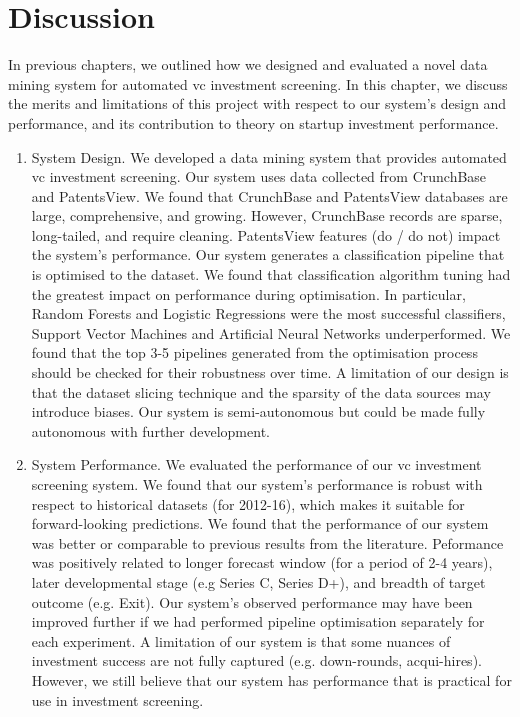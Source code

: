 \documentclass[../thesis/thesis.tex]{subfiles}
\begin{document}
\chapter{Discussion}
\label{chap:discussion}

In previous chapters, we outlined how we designed and evaluated a novel data mining system for automated \gls{vc} investment screening. In this chapter, we discuss the merits and limitations of this project with respect to our system's design and performance, and its contribution to theory on startup investment performance.

\begin{enumerate}

\item System Design. We developed a data mining system that provides automated \gls{vc} investment screening. Our system uses data collected from CrunchBase and PatentsView. We found that CrunchBase and PatentsView databases are large, comprehensive, and growing. However, CrunchBase records are sparse, long-tailed, and require cleaning. PatentsView features (do / do not) impact the system's performance. Our system generates a classification pipeline that is optimised to the dataset. We found that classification algorithm tuning had the greatest impact on performance during optimisation. In particular, Random Forests and Logistic Regressions were the most successful classifiers, Support Vector Machines and Artificial Neural Networks underperformed. We found that the top 3-5 pipelines generated from the optimisation process should be checked for their robustness over time. A limitation of our design is that the dataset slicing technique and the sparsity of the data sources may introduce biases. Our system is semi-autonomous but could be made fully autonomous with further development.

\item System Performance. We evaluated the performance of our \gls{vc} investment screening system. We found that our system's performance is robust with respect to historical datasets (for 2012-16), which makes it suitable for forward-looking predictions. We found that the performance of our system was better or comparable to previous results from the literature. Peformance was positively related to longer forecast window (for a period of 2-4 years), later developmental stage (e.g Series C, Series D+), and breadth of target outcome (e.g. Exit). Our system's observed performance may have been improved further if we had performed pipeline optimisation separately for each experiment. A limitation of our system is that some nuances of investment success are not fully captured (e.g. down-rounds, acqui-hires). However, we still believe that our system has performance that is practical for use in investment screening.


\end{enumerate}
\end{document}

